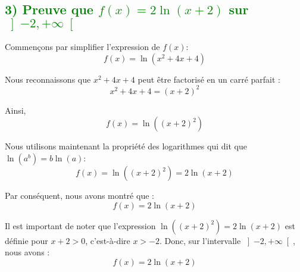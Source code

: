 \documentclass[12pt]{article}
\begin{document}
\begin{center}
\end{center}

\subsection*{\textcolor{green}{3) Preuve que \( f(x) = 2\ln(x+2) \) sur \( \left]-2, +\infty \right[ \)}}

Commençons par simplifier l'expression de \( f(x) \):
\[
f(x) = \ln(x^2 + 4x + 4)
\]

Nous reconnaissons que \( x^2 + 4x + 4 \) peut être factorisé en un carré parfait :
\[
x^2 + 4x + 4 = (x + 2)^2
\]

Ainsi,
\[
f(x) = \ln((x + 2)^2)
\]

Nous utilisons maintenant la propriété des logarithmes qui dit que \( \ln(a^b) = b \ln(a) \):
\[
f(x) = \ln((x + 2)^2) = 2 \ln(x + 2)
\]

Par conséquent, nous avons montré que :
\[
f(x) = 2 \ln(x + 2)
\]

Il est important de noter que l'expression \( \ln((x + 2)^2) = 2 \ln(x + 2) \) est définie pour \( x + 2 > 0 \), c'est-à-dire \( x > -2 \). Donc, sur l'intervalle \( \left]-2, +\infty \right[ \), nous avons :
\[
f(x) = 2 \ln(x + 2)
\]
\end{document}
